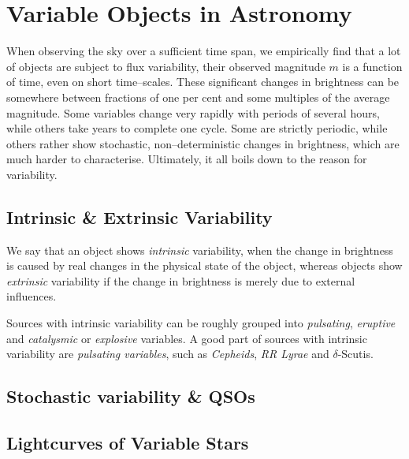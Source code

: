 \section{Variable Objects in Astronomy}
\label{sec:theory-variable-objects}

When observing the sky over a sufficient time span, we empirically find that a lot of objects are subject to flux variability, \ie their observed magnitude $m$ is a function of time, even on short time--scales. These significant changes in brightness can be somewhere between fractions of one per cent and some multiples of the average magnitude. Some variables change very rapidly with periods of several hours, while others take years to complete one cycle. Some are strictly periodic, while others rather show stochastic, non--deterministic changes in brightness, which are much harder to characterise. Ultimately, it all boils down to the reason for variability.

\subsection{Intrinsic \& Extrinsic Variability}

We say that an object shows \emph{intrinsic} variability, when the change in brightness is caused by real changes in the physical state of the object, whereas objects show \emph{extrinsic} variability if the change in brightness is merely due to external influences.

Sources with intrinsic variability can be roughly grouped into \emph{pulsating}, \emph{eruptive} and \emph{catalysmic} or \emph{explosive} variables.
A good part of sources with intrinsic variability are \emph{pulsating variables}, such as \emph{Cepheids}, \emph{RR Lyrae} and $\delta$-Scutis.


\subsection{Stochastic variability \& QSOs}
 

\subsection{Lightcurves of Variable Stars}


